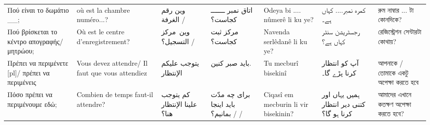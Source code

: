 \begin{longtable}{p{3.5cm} p{3.5cm} p{3.5cm} p{3.5cm} p{3.5cm} p{3.5cm} p{3.5cm} }
 Πού είναι το δωμάτιο \_\_;                                                                                                      & où est la chambre numéro...?                                                                    & وين رقم الغرفة /                                                                      & اتاق نمبر ـــــــ کجاست؟                                    & Odeya bi .... nûmerê li ku ye?                                                     & کمرہ نمبر.... کہاں ہے۔                                                         & রুম নাম্বার ... টা কোনদিকে?                                       \\
 Πού βρίσκεται το κέντρο απογραφής/μητρώου;                                                                                    & Où est le centre d'enregistrement?                                                              & وين مركز التسجيل؟ /                                                                   & مرکز ثبت کجاست؟                                             & Navenda serlêdanê li ku ye?                                                        & رجسٹریشن سنٹر کہاں ہے؟                                                         & রেজিস্ট্রেশন সেন্টারটা কোথায়?                                     \\
 Πρέπει να περιμένετε [pl]/ πρέπει να περιμένεις                                                                               & Vous devez attendre/ Il faut que vous attendiez                                                 & يتوجب عليكم الإنتظار                                                                  & باید صبر کنین.                                              & Tu mecburî bisekinî                                                                & آپ کو انتظار کرنا پڑے گا۔                                                      & আপনাকে / তোমাকে একটু অপেক্ষা করতে হবে                             \\
 Πόσο πρέπει να περιμένουμε εδώ;                                                                                               & Combien de temps faut-il attendre?                                                              & كم يتوجب علينا الإنتظار هنا؟                                                          & برای چه مدّت باید اینجا بمانیم؟ /  /                        & Ciqasî em mecburin li vir bisekinin?                                               & ہمیں یہاں اور کتنی دیر انتظار کرنا ہو گا؟                                      & আমাদের এখানে কতক্ষণ অপেক্ষা করতে হবে?                             \\

\end{longtable}
